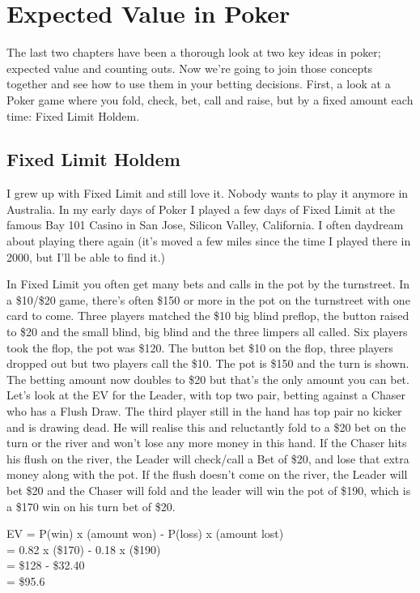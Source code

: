 \chapter{Expected Value in Poker}

The last two chapters have been a thorough look at two key ideas in
poker; expected value and counting outs. Now we're going to join
those concepts together and see how to use them in your betting
decisions. First, a look at a Poker game where you fold, check, bet,
call and raise, but by a fixed amount each time: Fixed Limit Holdem.

\section{Fixed Limit Holdem}

I grew up with Fixed Limit and still love it. Nobody wants to play it
anymore in Australia. In my early days of Poker I played a few days of
Fixed Limit at the famous Bay 101 Casino in San Jose, Silicon Valley,
California. I often daydream about playing there again (it's moved a
few miles since the time I played there in 2000, but I'll be able to
find it.)

In Fixed Limit you often get many bets and calls in the pot by the
turnstreet. In a \$10/\$20 game, there's often \$150 or more in the
pot on the turnstreet with one card to come. Three players matched the
\$10 big blind preflop, the button raised to \$20 and the small blind,
big blind and the three limpers all called. Six players took the flop,
the pot was \$120. The button bet \$10 on the flop, three players
dropped out but two players call the \$10. The pot is \$150 and the turn is
shown. The betting amount now doubles to \$20 but that's the only
amount you can bet. Let's look at the EV for the Leader, with top two
pair, betting against a Chaser who has a Flush Draw. The third player
still in the hand has top pair no kicker and is drawing dead. He will
realise this and reluctantly fold to a \$20 bet on the turn or the
river and won't lose any more money in this hand. If the Chaser hits
his flush on the river, the Leader will check/call a Bet of
\$20, and lose that extra money along with the pot. If the flush
doesn't come on the river, the Leader will bet \$20 and the Chaser will
fold and the leader will win the pot of \$190, which is a \$170 win on
his turn bet of \$20.

EV = P(win) x (amount won) - P(loss) x (amount lost) \\
   = 0.82   x (\$170)      - 0.18    x (\$190) \\
   = \$128 - \$32.40 \\
   = \$95.6

